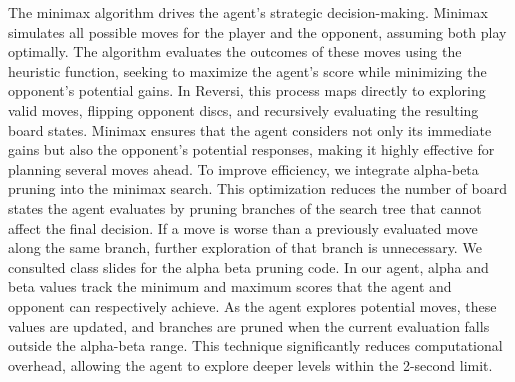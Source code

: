 \documentclass[11pt]{article}
\begin{document}
The minimax algorithm drives the agent's strategic decision-making. Minimax simulates all possible moves for the player and the opponent, assuming both play optimally. The algorithm evaluates the outcomes of these moves using the heuristic function, seeking to maximize the agent's score while minimizing the opponent's potential gains. In Reversi, this process maps directly to exploring valid moves, flipping opponent discs, and recursively evaluating the resulting board states. Minimax ensures that the agent considers not only its immediate gains but also the opponent's potential responses, making it highly effective for planning several moves ahead. To improve efficiency, we integrate alpha-beta pruning into the minimax search. This optimization reduces the number of board states the agent evaluates by pruning branches of the search tree that cannot affect the final decision. If a move is worse than a previously evaluated move along the same branch, further exploration of that branch is unnecessary. We consulted class slides for the alpha beta pruning code. In our agent, alpha and beta values track the minimum and maximum scores that the agent and opponent can respectively achieve. As the agent explores potential moves, these values are updated, and branches are pruned when the current evaluation falls outside the alpha-beta range. This technique significantly reduces computational overhead, allowing the agent to explore deeper levels within the 2-second limit.
\end{document}
